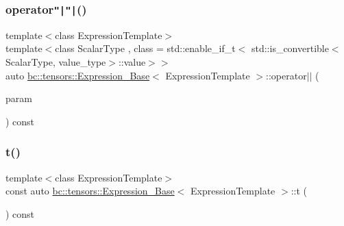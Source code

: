 \mbox{\label{classbc_1_1tensors_1_1Expression__Base_adddbf56e355b10bb782f250fd5207659}} 
\subsubsection{\texorpdfstring{operator\texttt{"|}\texttt{"|}()}{operator||()}\hspace{0.1cm}{\footnotesize\ttfamily [2/2]}}
{\footnotesize\ttfamily template$<$class Expression\+Template$>$ \\
template$<$class Scalar\+Type , class  = std\+::enable\+\_\+if\+\_\+t$<$   std\+::is\+\_\+convertible$<$\+Scalar\+Type, value\+\_\+type$>$\+::value$>$$>$ \\
auto \hyperlink{classbc_1_1tensors_1_1Expression__Base}{bc\+::tensors\+::\+Expression\+\_\+\+Base}$<$ Expression\+Template $>$\+::operator$\vert$$\vert$ (\begin{DoxyParamCaption}\item[{const Scalar\+Type \&}]{param }\end{DoxyParamCaption}) const\hspace{0.3cm}{\ttfamily [inline]}}

\mbox{\label{classbc_1_1tensors_1_1Expression__Base_a9d0a28c277828fc43cc3b352bd73ec00}} 
\subsubsection{\texorpdfstring{t()}{t()}\hspace{0.1cm}{\footnotesize\ttfamily [1/2]}}
{\footnotesize\ttfamily template$<$class Expression\+Template$>$ \\
const auto \hyperlink{classbc_1_1tensors_1_1Expression__Base}{bc\+::tensors\+::\+Expression\+\_\+\+Base}$<$ Expression\+Template $>$\+::t (\begin{DoxyParamCaption}{ }\end{DoxyParamCaption}) const\hspace{0.3cm}{\ttfamily [inline]}}

